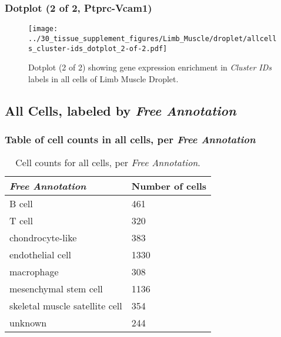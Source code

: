 \clearpage

\subsubsection{Dotplot (2 of 2, Ptprc-Vcam1)}
\begin{figure}[h]
\centering
\texttt{[image: ../30\_tissue\_supplement\_figures/Limb\_Muscle/droplet/allcells\_cluster-ids\_dotplot\_2-of-2.pdf]}

\caption{ Dotplot (2 of 2)  showing gene expression enrichment in \emph{Cluster IDs} labels in all cells of Limb Muscle Droplet. }
\end{figure}


\clearpage

\subsection{All Cells, labeled by \emph{Free Annotation}}
\subsubsection{Table of cell counts in all cells, per \emph{Free Annotation}}\begin{table}[h]
\centering
\label{my-label}
\begin{tabular}{@{}ll@{}}
\toprule

\emph{Free Annotation}& Number of cells \\ \midrule
B cell & 461 \\

T cell & 320 \\

chondrocyte-like & 383 \\

endothelial cell & 1330 \\

macrophage & 308 \\

mesenchymal stem cell & 1136 \\

skeletal muscle satellite cell & 354 \\

unknown & 244 \\
\bottomrule
\end{tabular}
\caption{Cell counts for all cells, per \emph{Free Annotation}.}
\end{table}

\clearpage
